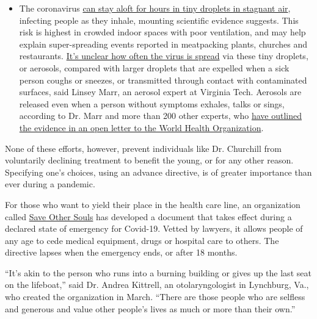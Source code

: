 \begin{itemize}
  \begin{itemize}
  \tightlist
  \item
    The coronavirus
    \href{https://www.nytimes.com/2020/07/04/health/239-experts-with-one-big-claim-the-coronavirus-is-airborne.html?action=click\&pgtype=Article\&state=default\&region=MAIN_CONTENT_3\&context=storylines_faq}{can
    stay aloft for hours in tiny droplets in stagnant air}, infecting
    people as they inhale, mounting scientific evidence suggests. This
    risk is highest in crowded indoor spaces with poor ventilation, and
    may help explain super-spreading events reported in meatpacking
    plants, churches and restaurants.
    \href{https://www.nytimes.com/2020/07/06/health/coronavirus-airborne-aerosols.html?action=click\&pgtype=Article\&state=default\&region=MAIN_CONTENT_3\&context=storylines_faq}{It's
    unclear how often the virus is spread} via these tiny droplets, or
    aerosols, compared with larger droplets that are expelled when a
    sick person coughs or sneezes, or transmitted through contact with
    contaminated surfaces, said Linsey Marr, an aerosol expert at
    Virginia Tech. Aerosols are released even when a person without
    symptoms exhales, talks or sings, according to Dr. Marr and more
    than 200 other experts, who
    \href{https://academic.oup.com/cid/article/doi/10.1093/cid/ciaa939/5867798}{have
    outlined the evidence in an open letter to the World Health
    Organization}.
  \end{itemize}
\end{itemize}

None of these efforts, however, prevent individuals like Dr. Churchill
from voluntarily declining treatment to benefit the young, or for any
other reason. Specifying one's choices, using an advance directive, is
of greater importance than ever during a pandemic.

For those who want to yield their place in the health care line, an
organization called \href{https://www.saveothersouls.org/}{Save Other
Souls} has developed a document that takes effect during a declared
state of emergency for Covid-19. Vetted by lawyers, it allows people of
any age to cede medical equipment, drugs or hospital care to others. The
directive lapses when the emergency ends, or after 18 months.

``It's akin to the person who runs into a burning building or gives up
the last seat on the lifeboat,'' said Dr. Andrea Kittrell, an
otolaryngologist in Lynchburg, Va., who created the organization in
March. ``There are those people who are selfless and generous and value
other people's lives as much or more than their own.''

